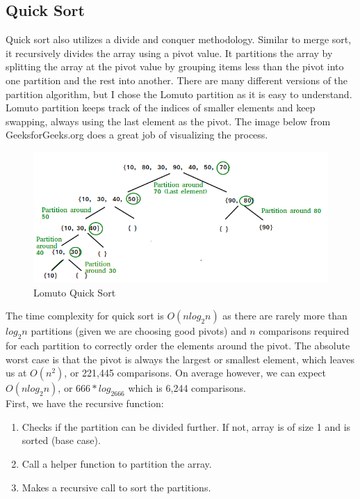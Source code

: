 \documentclass[letterpaper, 10pt]{article}
\begin{document}
\subsection{Quick Sort}
Quick sort also utilizes a divide and conquer methodology. Similar to merge sort, it recursively divides the array using a pivot value. It partitions the array by splitting the array at the pivot value by grouping items less than the pivot into one partition and the rest into another. There are many different versions of the partition algorithm, but I chose the Lomuto partition as it is easy to understand. Lomuto partition keeps track of the indices of smaller elements and keep swapping, always using the last element as the pivot. The image below from GeeksforGeeks.org does a great job of visualizing the process. \\
\begin{figure}[h]
    \centering
    \includegraphics[width=1\linewidth]{quickSort.png}
    \caption{Lomuto Quick Sort}
    \label{fig:enter-label}
\end{figure}
\newline
The time complexity for quick sort is $O(nlog_2n)$ as there are rarely more than \(log_2n \) partitions (given we are choosing good pivots) and $n$ comparisons required for each partition to correctly order the elements around the pivot. The absolute worst case is that the pivot is always the largest or smallest element, which leaves us at $O(n^2)$, or 221,445 comparisons. On average however, we can expect $O(nlog_2n)$, or $666*log_2666$ which is 6,244 comparisons.\\
\newline
First, we have the recursive function: 
\begin{enumerate}
    \item Checks if the partition can be divided further. If not, array is of size 1 and is sorted (base case).
    \item Call a helper function to partition the array.
    \item Makes a recursive call to sort the partitions.
\end{enumerate}
\end{document}
